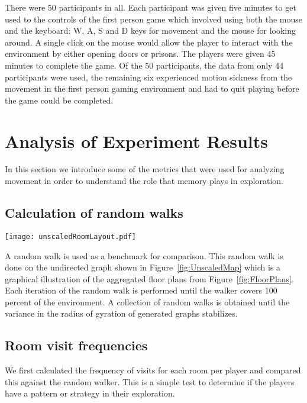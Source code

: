 There were 50 participants in all. Each participant was given five minutes to get used to the controls of the first person game which involved using both the mouse and the keyboard: W, A, S and D keys for movement and the mouse for looking around. A single click on the mouse would allow the player to interact with the environment by either opening doors or prisons. The players were given 45 minutes to complete the game. Of the 50 participants, the data from only 44 participants were used, the remaining six experienced motion sickness from the movement in the first person gaming environment and had to quit playing before the game could be completed.



\section{Analysis of Experiment Results} %
\label{sec:analysis_of_experiment_results}

In this section we introduce some of the metrics that were used for analyzing movement in order to understand the role that memory plays in exploration.

\subsection{Calculation of random walks}

\begin{figure*}[!htb]
\centering
\texttt{[image: unscaledRoomLayout.pdf]}
\caption{Room Layout Graph}
\label{fig:UnscaledMap}
\end{figure*}

A random walk is used as a benchmark for comparison. This random walk is done on the undirected graph shown in Figure~\ref{fig:UnscaledMap} which is a graphical illustration of the aggregated floor plans from Figure~\ref{fig:FloorPlans}. Each iteration of the random walk is performed until the walker covers 100 percent of the environment. A collection of random walks is obtained until the variance in the radius of gyration of generated graphs stabilizes.


\subsection{Room visit frequencies}


We first calculated the frequency of visits for each room per player and compared this against the random walker. This is a simple test to determine if the players have a pattern or strategy in their exploration.

